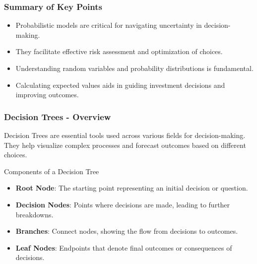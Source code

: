 \documentclass[aspectratio=169]{beamer}
\begin{document}
\begin{frame}[fragile]
    \frametitle{Summary of Key Points}
    \begin{itemize}
        \item Probabilistic models are critical for navigating uncertainty in decision-making.
        \item They facilitate effective risk assessment and optimization of choices.
        \item Understanding random variables and probability distributions is fundamental.
        \item Calculating expected values aids in guiding investment decisions and improving outcomes.
    \end{itemize}
\end{frame}

\begin{frame}[fragile]
    \frametitle{Decision Trees - Overview}
    Decision Trees are essential tools used across various fields for decision-making. They help visualize complex processes and forecast outcomes based on different choices.
    
    \begin{block}{Components of a Decision Tree}
        \begin{itemize}
            \item \textbf{Root Node}: The starting point representing an initial decision or question.
            \item \textbf{Decision Nodes}: Points where decisions are made, leading to further breakdowns.
            \item \textbf{Branches}: Connect nodes, showing the flow from decisions to outcomes.
            \item \textbf{Leaf Nodes}: Endpoints that denote final outcomes or consequences of decisions.
        \end{itemize}
    \end{block}
\end{frame}
\end{document}
